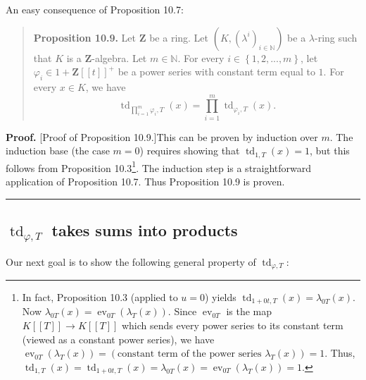 \documentclass[numbers=enddot,12pt,final,onecolumn,notitlepage]{scrartcl}%
\newenvironment{proof}[1][Proof]{\noindent\textbf{#1.} }{\ \rule{0.5em}{0.5em}}
\begin{document}
An easy consequence of Proposition 10.7:

\begin{quote}
\textbf{Proposition 10.9.} Let $\mathbf{Z}$ be a ring. Let $\left(  K,\left(
\lambda^{i}\right)  _{i\in\mathbb{N}}\right)  $ be a $\lambda$-ring such that
$K$ is a $\mathbf{Z}$-algebra. Let $m\in\mathbb{N}$. For every $i\in\left\{
1,2,...,m\right\}  $, let $\varphi_{i}\in1+\mathbf{Z}\left[  \left[  t\right]
\right]  ^{+}$ be a power series with constant term equal to $1$. For every
$x\in K$, we have%
\[
\operatorname*{td}\nolimits_{\prod\limits_{i=1}^{m}\varphi_{i},T}\left(
x\right)  =\prod\limits_{i=1}^{m}\operatorname*{td}\nolimits_{\varphi_{i}%
,T}\left(  x\right)  .
\]



\end{quote}

\begin{proof}
[Proof of Proposition 10.9.]This can be proven by induction over $m$. The
induction base (the case $m=0$) requires showing that $\operatorname*{td}%
\nolimits_{1,T}\left(  x\right)  =1$, but this follows from Proposition
10.3\footnote{In fact, Proposition 10.3 (applied to $u=0$) yields
$\operatorname*{td}\nolimits_{1+0t,T}\left(  x\right)  =\lambda_{0T}\left(
x\right)  $. Now $\lambda_{0T}\left(  x\right)  =\operatorname*{ev}%
\nolimits_{0T}\left(  \lambda_{T}\left(  x\right)  \right)  $. Since
$\operatorname*{ev}\nolimits_{0T}$ is the map $K\left[  \left[  T\right]
\right]  \rightarrow K\left[  \left[  T\right]  \right]  $ which sends every
power series to its constant term (viewed as a constant power series), we have
$\operatorname*{ev}\nolimits_{0T}\left(  \lambda_{T}\left(  x\right)  \right)
=\left(  \text{constant term of the power series }\lambda_{T}\left(  x\right)
\right)  =1$. Thus, $\operatorname*{td}\nolimits_{1,T}\left(  x\right)
=\operatorname*{td}\nolimits_{1+0t,T}\left(  x\right)  =\lambda_{0T}\left(
x\right)  =\operatorname*{ev}\nolimits_{0T}\left(  \lambda_{T}\left(
x\right)  \right)  =1$.}. The induction step is a straightforward application
of Proposition 10.7. Thus Proposition 10.9 is proven.
\end{proof}

\subsection{$\operatorname*{td}\nolimits_{\varphi,T}$ takes sums into
products}

Our next goal is to show the following general property of $\operatorname*{td}%
\nolimits_{\varphi,T}$:
\end{document}
